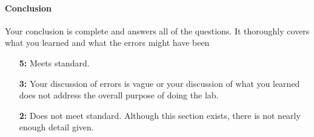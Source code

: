\documentclass[10pt]{exam}
\begin{document}
\vspace{-0.25em}

\paragraph{Conclusion} Your conclusion is complete and answers all of the questions.  It thoroughly covers what you learned and what the errors might have been	
\begin{itemize}
  \item[\bf 5:] Meets standard.	
  \item[\bf 3:] Your discussion of errors is vague or your discussion of what you learned does not address the overall purpose of doing the lab.
  \item[\bf 2:]Does not meet standard. Although this section exists, there is not nearly enough detail given.
\end{itemize}
\end{document}
